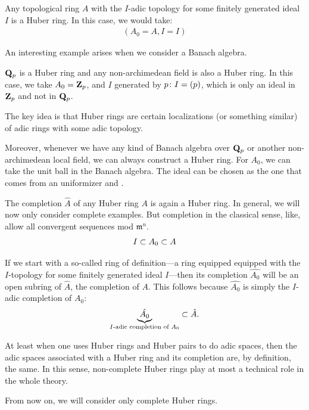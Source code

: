 \bex
Any topological ring $A$ with the $I$-adic topology for some finitely generated ideal $I$ is a Huber ring. In this case, we would take:
\begin{align*}
(A_0 = A, I = I)
\end{align*}
\eex

An interesting example arises when we consider a Banach algebra.

\bex
$\mathbf Q_p$ is a Huber ring and any non-archimedean field is also a Huber ring. In this case, we take $A_0 = \mathbf Z_p$, and $I$ generated by $p \colon I = (p)$, which is only an ideal in $\mathbf Z_p$ and not in $\mathbf Q_p$.

\eex

The key idea is that Huber rings are certain localizations (or something similar) of adic rings with some adic topology.

Moreover, whenever we have any kind of Banach algebra over $\mathbf Q_p$ or another non-archimedean local field, we can always construct a Huber ring. For $A_0$, we can take the unit ball in the Banach algebra. The ideal can be chosen as the one that comes from an uniformizer and .

\br
The completion $\hat{A}$ of any Huber ring $A$ is again a Huber ring. In general, we will now only consider complete  examples. But completion in the classical sense, like, allow all convergent sequences mod $\mathfrak{m}^n$.
\begin{align*}
I \subset A_0 \subset A
\end{align*}

If we start with a so-called ring of definition---a ring equipped equipped with the $I$-topology for some finitely generated ideal $I$---then its completion $\hat{A_0}$ will be an open subring of $\hat{A}$, the completion of $A$. This follows because $\hat{A_0}$ is simply the $I$-adic completion of $A_0$:
\begin{align*}
\underbrace{\hat{A_0}}_{\text{$I$-adic completion of $A_0$}} \subset \hat{A}.
\end{align*}

At least when one uses Huber rings and Huber pairs to do adic spaces, then the adic spaces associated with a Huber ring and its completion are, by definition, the same. In this sense, non-complete Huber rings play at most a technical role in the whole theory.

From now on, we will consider only complete Huber rings.

